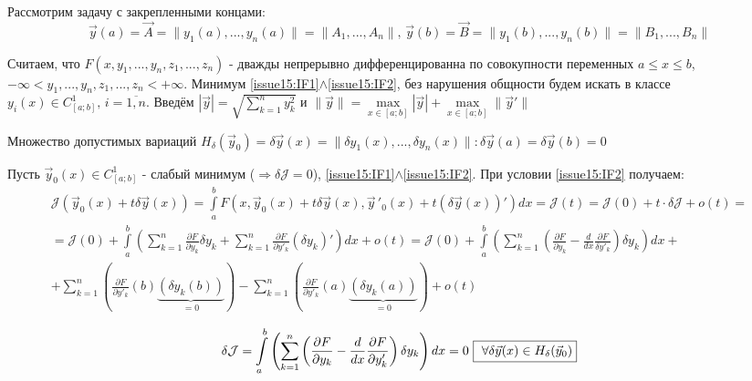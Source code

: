 \documentclass[a4paper, 12pt]{article}
\begin{document}
        Рассмотрим задачу с закрепленными концами: 
        \begin{equation} \label{issue15:IF2}
            \vec{y}(a) = \vec{A} = \| y_1(a), ..., y_n(a)\| = \| A_1, ..., A_n\|,\, \vec{y}(b) = \vec{B} = \| y_1(b), ..., y_n(b)\| = \| B_1, ..., B_n \|
        \end{equation}
        
        Считаем, что $F(x, y_1, ..., y_n, z_1, ..., z_n)$ - дважды непрерывно дифференцированна по совокупности переменных $a \leq x \leq b$, $-\infty < y_1, ..., y_n, z_1, ..., z_n < +\infty$. 
        Минимум \eqref{issue15:IF1}$\wedge$\eqref{issue15:IF2}, без нарушения общности будем искать в классе $y_i(x) \in C^1_{[a;b]}, \, i = \overline{1, n}$. 
        Введём $|\vec{y}| = \sqrt{\sum \limits_{k=1}^{n} y^2_k}$ и $\|\vec{y}\| = \max \limits_{x \in [a;b]} |\vec{y}| + \max \limits_{x \in [a;b]} \| \vec{y}' \|$ 

        Множество допустимых вариаций $H_{\delta}(\vec{y}_0) = {\delta \vec{y}(x) = \| \delta y_1 (x), ..., \delta y_n(x)\|: \delta \vec{y}(a) = \delta \vec{y}(b) = 0}$

        Пусть $\vec{y}_0(x) \in C^1_{[a;b]}$ - слабый минимум ($\Rightarrow \delta \mathcal{J} = 0$), \eqref{issue15:IF1}$\wedge$\eqref{issue15:IF2}. При условии \eqref{issue15:IF2} получаем:
        \begin{multline*}
             \mathcal{J}(\vec{y}_0(x) + t \delta \vec{y}(x)) = \int \limits_a^b F(x, \vec{y}_0(x) + t\delta \vec{y}(x), \vec{y}\,'_0(x) + t(\delta \vec{y}(x))')dx = \mathcal{J}(t) = \mathcal{J}(0) + t \cdot \delta\mathcal{J} + o(t) = \\
             = \mathcal{J}(0) + \int \limits_a^b \left( \sum \limits_{k =1}^n \frac{\partial F}{\partial y_k} \delta y_k + \sum \limits_{k=1}^n \frac{\partial F}{\partial y'_k} (\delta y_k)' \right) dx + o(t) = \mathcal{J}(0) + \int \limits_a^b \left( \sum \limits_{k = 1}^n \left( \frac{\partial F}{\partial y_k} - \frac{d}{dx} \frac{\partial F}{\delta y'_k}  \right) \delta y_k \right) dx + \\
             + \sum \limits_{k = 1}^n \left( \frac{\partial F}{\partial y'_k}(b) \underbrace{(\delta y_k (b))}_{= 0} \right) - \sum \limits_{k = 1}^n \left( \frac{\partial F}{\partial y'_k}(a) \underbrace{(\delta y_k (a))}_{= 0} \right) + o(t) 
        \end{multline*}

        \[ \delta \mathcal{J} = \int \limits_a^b \left(\sum \limits_{k = 1}^n \left( \frac{\partial F}{\partial y_k} - 
        \frac{d}{dx} \frac{\partial F}{\partial y'_k} \right) \delta y_k \right) dx = 0 \,\, 
        \text{\fbox{  $\forall \delta \vec{y}(x) \in H_{\delta}(\vec{y}_0) $}}
        \]
\end{document}
